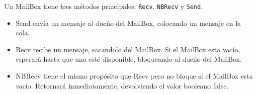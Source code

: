 \documentclass[a4paper,oneside]{article}
\begin{document}
Un MailBox tiene tres métodos principales: \texttt{Recv}, \texttt{NBRecv} y 
\texttt{Send}.

\begin{itemize}
\item Send envía un mensaje al dueño del MailBox, colocando un mensaje en la cola.
\item Recv recibe un mensaje, sacandolo del MailBox. Si el MailBox esta vacío, esperará hasta que uno esté disponible, bloqueando al dueño del MailBox. 
\item NBRecv tiene el mismo propósito que Recv pero no bloque si el MailBox esta vacío. Retornará inmediatamente, devolviendo el valor booleano false. 
\end{itemize}

% 
% 
% 
% 
% 
% 
% 
\end{document}
